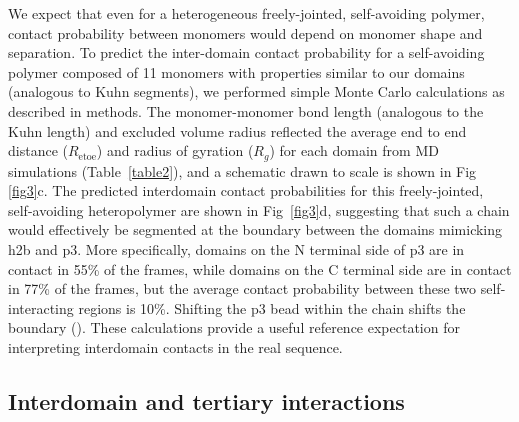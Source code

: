 \documentclass[10pt,letterpaper]{article}
\begin{document}

We expect that even for a heterogeneous freely-jointed, self-avoiding polymer, contact probability between monomers would depend on monomer shape and separation. To predict the inter-domain contact probability for a self-avoiding polymer composed of 11 monomers with properties similar to our domains (analogous to Kuhn segments\cite{Rubinstein2003}), we performed simple Monte Carlo calculations as described in methods. The monomer-monomer bond length (analogous to the Kuhn length) and excluded volume radius reflected the average end to end distance ($R_{\mathrm{etoe}}$) and radius of gyration ($R_{g}$) for each domain from MD simulations (Table~\ref{table2}), and a schematic drawn to scale is shown in Fig \ref{fig3}c. The predicted interdomain contact probabilities for this freely-jointed, self-avoiding heteropolymer are shown in Fig~\ref{fig3}d, suggesting that such a chain would effectively be segmented at the boundary between the domains mimicking h2b and p3. More specifically, domains on the N terminal side of p3 are in contact in 55\% of the frames, while domains on the C terminal side are in contact in 77\% of the frames, but the average contact probability between these two self-interacting regions is 10\%. Shifting the p3 bead within the chain shifts the boundary (). These calculations provide a useful reference expectation for interpreting interdomain contacts in the real sequence.

\subsection{Interdomain and tertiary interactions}

\end{document}
